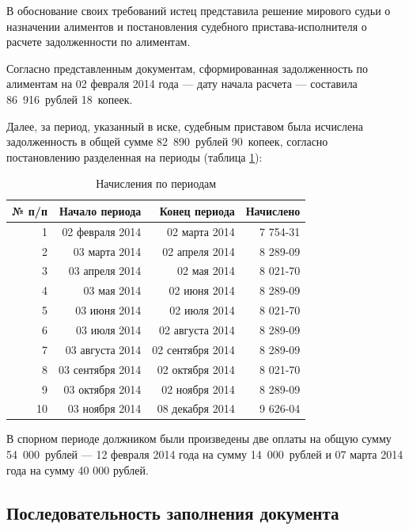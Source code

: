 \documentclass[a4paper,12pt,draft]{article}
\begin{document}
В обоснование своих требований истец представила решение мирового судьи о назначении алиментов и постановления судебного пристава-исполнителя о расчете задолженности по алиментам.

Согласно представленным документам, сформированная задолженность по алиментам на 02 февраля 2014 года --- дату начала расчета --- составила 86~916~рублей 18~копеек.

Далее, за период, указанный в иске, судебным приставом была исчислена задолженность в общей сумме 82~890~рублей 90~копеек, согласно постановлению разделенная на периоды (таблица \ref{tab:neus}):



\begin{table}[h]
\begin{center}
\begin{tabular}{|r|r|r|r|}
\hline
\bf № п/п&\bf Начало периода&\bf Конец периода&\bf Начислено\\
\hline
1&02 февраля 2014&02 марта 2014&7 754-31\\
\hline
2&03 марта 2014&02 апреля 2014&8 289-09\\
\hline
3&03 апреля 2014&02 мая 2014&8 021-70\\
\hline
4&03 мая 2014&02 июня 2014&8 289-09\\
\hline
5&03 июня 2014&02 июля 2014&8 021-70\\
\hline
6&03 июля 2014&02 августа 2014&8 289-09\\
\hline
7&03 августа 2014&02 сентября 2014&8 289-09\\
\hline
8&03 сентября 2014&02 октября 2014&8 021-70\\
\hline
9&03 октября 2014&02 ноября 2014&8 289-09\\
\hline
10&03 ноября 2014&08 декабря 2014&9 626-04\\
\hline
\end{tabular}
\end{center}
\caption{Начисления по периодам}
\label{tab:neus}
\end{table}

В спорном периоде должником были произведены две оплаты на общую сумму 54~000~рублей --- 12 февраля 2014 года на сумму 14~000~рублей и 07 марта 2014 года на сумму 40 000 рублей.
\subsection{Последовательность заполнения документа}
\end{document}
